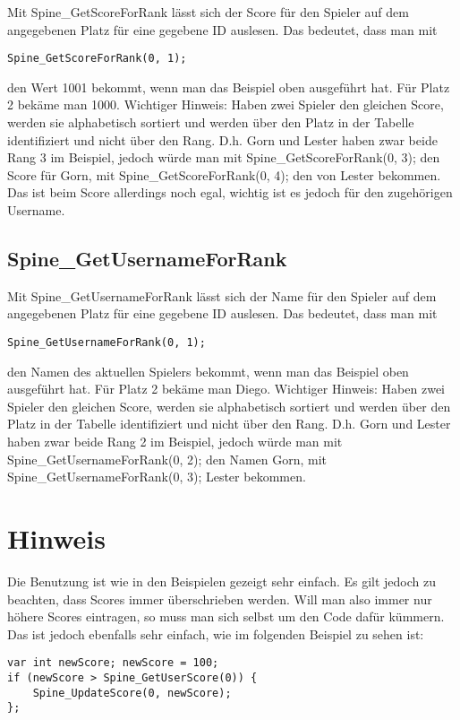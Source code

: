 \documentclass{article}
\begin{document}
Mit Spine\_GetScoreForRank lässt sich der Score für den Spieler auf dem angegebenen Platz für eine gegebene ID auslesen. Das bedeutet, dass man mit

\begin{lstlisting}
Spine_GetScoreForRank(0, 1);
\end{lstlisting}

den Wert 1001 bekommt, wenn man das Beispiel oben ausgeführt hat. Für Platz 2 bekäme man 1000.
Wichtiger Hinweis: Haben zwei Spieler den gleichen Score, werden sie alphabetisch sortiert und werden über den Platz in der Tabelle identifiziert und nicht über den Rang. D.h. Gorn und Lester haben zwar beide Rang 3 im Beispiel, jedoch würde man mit Spine\_GetScoreForRank(0, 3); den Score für Gorn, mit Spine\_GetScoreForRank(0, 4); den von Lester bekommen. Das ist beim Score allerdings noch egal, wichtig ist es jedoch für den zugehörigen Username.

\subsection{Spine\_GetUsernameForRank}

Mit Spine\_GetUsernameForRank lässt sich der Name für den Spieler auf dem angegebenen Platz für eine gegebene ID auslesen. Das bedeutet, dass man mit

\begin{lstlisting}
Spine_GetUsernameForRank(0, 1);
\end{lstlisting}

den Namen des aktuellen Spielers bekommt, wenn man das Beispiel oben ausgeführt hat. Für Platz 2 bekäme man Diego.
Wichtiger Hinweis: Haben zwei Spieler den gleichen Score, werden sie alphabetisch sortiert und werden über den Platz in der Tabelle identifiziert und nicht über den Rang. D.h. Gorn und Lester haben zwar beide Rang 2 im Beispiel, jedoch würde man mit Spine\_GetUsernameForRank(0, 2); den Namen Gorn, mit Spine\_GetUsernameForRank(0, 3); Lester bekommen.

\section{Hinweis}

Die Benutzung ist wie in den Beispielen gezeigt sehr einfach. Es gilt jedoch zu beachten, dass Scores immer überschrieben werden. Will man also immer nur höhere Scores eintragen, so muss man sich selbst um den Code dafür kümmern. Das ist jedoch ebenfalls sehr einfach, wie im folgenden Beispiel zu sehen ist:

\begin{lstlisting}
var int newScore; newScore = 100;
if (newScore > Spine_GetUserScore(0)) {
	Spine_UpdateScore(0, newScore);
};
\end{lstlisting}
\end{document}

